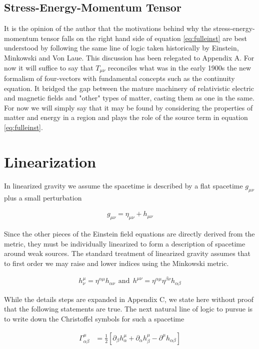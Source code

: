 \subsection{Stress-Energy-Momentum Tensor}
It is the opinion of the author that the motivations behind why the stress-energy-momentum tensor falls on the right hand side of equation \ref{eq:fulleinst} are best understood by following the same line of logic taken historically by Einstein, Minkowski and Von Laue. This discussion has been relegated to Appendix A. For now it will suffice to say that $T_{\mu \nu}$ reconciles what was in the early 1900s the new formalism of four-vectors with fundamental concepts such as the continuity equation. It bridged the gap between the mature machinery of relativistic electric and magnetic fields and "other" types of matter, casting them as one in the same. For now we will simply say that it may be found by considering the properties of matter and energy in a region and plays the role of the source term in equation \ref{eq:fulleinst}.   

\section{Linearization}

In linearized gravity we assume the spacetime is described by a flat spacetime $g_{\mu \nu}$ plus a small perturbation

\begin{align}\label{eq:metpluspert}
g_{\mu \nu} = \eta_{\mu \nu} + h_{\mu \nu}
\end{align}

Since the other pieces of the Einstein field equations are directly derived from the metric, they must be individually linearized to form a description of spacetime around weak sources. The standard treatment of linearized gravity assumes that to first order we may raise and lower indices using the Minkowski metric.

\begin{align}
h^\mu_\nu = \eta^{\alpha \mu} h_{\alpha \nu} \ \  \text{and} \ \ h^{\mu \nu} = \eta^{\alpha \mu}\eta^{\beta \nu}h_{\alpha \beta}
\end{align}

While the details steps are expanded in Appendix C, we state here without proof that the following statements are true. The next natural line of logic to pursue is to write down the Christoffel symbols for such a spacetime

\begin{align}
\Gamma^{\mu}_{\alpha \beta} &= \frac{1}{2} \left[\partial_{\beta} h^{\mu}_{\alpha} + \partial_{\alpha}h_{\beta}^{\mu} - \partial^{\mu}h_{\alpha \beta}\right] 
\end{align}

